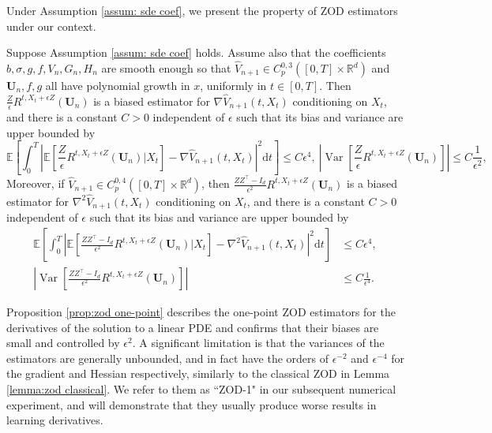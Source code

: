 \documentclass[twoside,11pt]{article}
\newcommand{\dd}{\mathrm{d}}
\newcommand{\E}{\mathbb{E}}
\newcommand{\R}{\mathbb{R}}
\newcommand{\1}{\mathbf{1}}
\numberwithin{equation}{section}
\begin{document}
Under Assumption \ref{assum: sde coef}, we present the property of ZOD estimators under our context.
\begin{proposition}
\label{prop:zod one-point}
Suppose Assumption \ref{assum: sde coef} holds. Assume also that the coefficients $ b,\sigma, g,f,V_n,G_n,H_n$ are smooth enough so that $ \hat V_{n+1}\in C_p^{0,3}([0,T]\times\R^d)$ and  $\mathbf{U}_n,f,g$ all have polynomial growth in $x$, uniformly in $t\in[0,T]$. Then $\frac{Z}{\epsilon}R^{t,X_t+\epsilon Z}(\mathbf{U}_n)$ is a biased estimator for $\nabla \hat V_{n+1}(t,X_t)$ conditioning on $ X_t$, and there is a constant $ C>0$ independent of $ \epsilon$ such that its bias and variance are upper bounded by
\[ \E\left[\int_0^T\left| \E\left[ \frac{Z}{\epsilon} R^{t,X_t+\epsilon Z}(\mathbf{U}_n)\Big| X_t  \right] -\nabla \hat V_{n+1}(t,X_t) \right|^2\dd t\right] \leq C\epsilon^4,\ \left|\operatorname{Var}\left[\frac{Z}{\epsilon} R^{t,X_t+\epsilon Z}(\mathbf{U}_n) \right]\right| \leq C\frac{1}{\epsilon^2} ,  \]
Moreover, if $\hat V_{n+1} \in C_p^{0,4}([0,T]\times\R^d)$, then $ \frac{ZZ^{\top}- I_d}{\epsilon^2}R^{t,X_t+\epsilon Z}(\mathbf{U}_n)$ is a biased estimator for $ \nabla^2 \hat V_{n+1}(t,X_t)$ conditioning on $ X_t$, and there is a constant $ C>0$ independent of $ \epsilon$ such that its bias and variance are upper bounded by
\begin{equation}
\begin{aligned}
\E\left[\int_0^T\left|\E\left[\frac{ZZ^{\top}- I_d}{\epsilon^2}R^{t,X_t+\epsilon Z}(\mathbf{U}_n) \Big |X_t\right]- \nabla^2 \hat V_{n+1}(t,X_t)\right|^2 \dd t \right] &\le C\epsilon^4, \\
    \left|\operatorname{Var}\left[ \frac{ZZ^{\top}- I_d}{\epsilon^2}R^{t,X_t+\epsilon Z}(\mathbf{U}_n)\right]\right| &\le C\frac{1}{\epsilon^4}.
    \end{aligned}
\end{equation}
\end{proposition}

Proposition \ref{prop:zod one-point} describes the one-point ZOD estimators for the derivatives of the solution to a linear PDE and confirms that their biases are small and controlled by $\epsilon^2$. A significant limitation is that the variances of the estimators are generally  unbounded, and in fact have the orders of $\epsilon^{-2}$ and $\epsilon^{-4}$ for the gradient and Hessian respectively, similarly to the classical ZOD in Lemma \ref{lemma:zod classical}. We refer to them as ``ZOD-1" in our subsequent numerical experiment, and will demonstrate that they usually produce worse results in learning derivatives.
\end{document}
